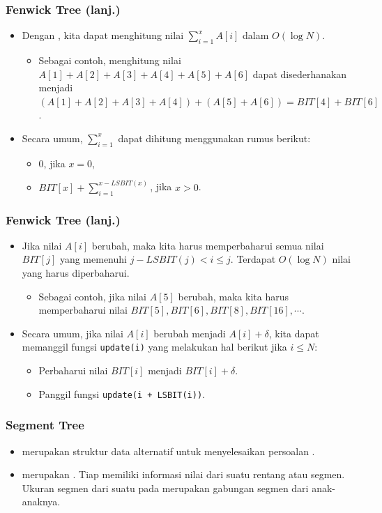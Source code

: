 \begin{frame}
\frametitle{Fenwick Tree (lanj.)}
\begin{itemize}
  \item Dengan \ffenwickTree, kita dapat menghitung nilai $\sum_{i=1}^{x} A[i]$ dalam $O(\log N)$.
  \begin{itemize}
    \item Sebagai contoh, menghitung nilai $A[1] + A[2] + A[3] + A[4] + A[5] + A[6]$ dapat disederhanakan menjadi $(A[1] + A[2] + A[3] + A[4]) + (A[5] + A[6]) = BIT[4] + BIT[6]$.
  \end{itemize}
  \item Secara umum, $\sum_{i=1}^{x}$ dapat dihitung menggunakan rumus berikut:
  \begin{itemize}
    \item $0$, jika $x = 0$,
    \item $BIT[x] + \sum_{i=1}^{x - LSBIT(x)}$, jika $x > 0$.
  \end{itemize}
\end{itemize}
\end{frame}

\begin{frame}
\frametitle{Fenwick Tree (lanj.)}
\begin{itemize}
  \item Jika nilai $A[i]$ berubah, maka kita harus memperbaharui semua nilai $BIT[j]$ yang memenuhi $j - LSBIT(j) < i \leq j$. Terdapat $O(\log N)$ nilai yang harus diperbaharui.
  \begin{itemize}
    \item Sebagai contoh, jika nilai $A[5]$ berubah, maka kita harus memperbaharui nilai $BIT[5], BIT[6], BIT[8], BIT[16], \cdots$.
  \end{itemize}
  \item Secara umum, jika nilai $A[i]$ berubah menjadi $A[i] + \delta$, kita dapat memanggil fungsi \lstinline{update(i)} yang melakukan hal berikut jika $i \leq N$:
  \begin{itemize}
    \item Perbaharui nilai $BIT[i]$ menjadi $BIT[i] + \delta$.
    \item Panggil fungsi \lstinline{update(i + LSBIT(i))}.
  \end{itemize}
\end{itemize}
\end{frame}

\begin{frame}
\frametitle{Segment Tree}
\begin{itemize}
  \item {} merupakan struktur data alternatif untuk menyelesaikan persoalan \frangeSumQuery.
  \item \fSegmentTree merupakan \fbinaryTree. Tiap \fnode memiliki informasi nilai dari suatu rentang atau segmen. Ukuran segmen dari suatu \fnode pada \fsegmentTree merupakan gabungan segmen dari anak-anaknya.
\end{itemize}
\end{frame}

